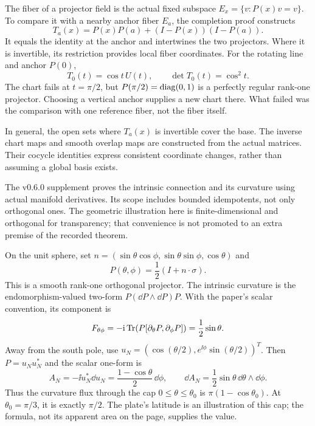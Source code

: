 The fiber of a projector field is the actual fixed subspace $E_x=\{v:P(x)v=v\}$. To compare it with a nearby anchor fiber $E_a$, the completion proof constructs
\[
T_a(x)=P(x)P(a)+(I-P(x))(I-P(a)).
\]
It equals the identity at the anchor and intertwines the two projectors. Where it is invertible, its restriction provides local fiber coordinates.
For the rotating line and anchor $P(0)$,
\[
T_0(t)=\cos t\,U(t),\qquad \det T_0(t)=\cos^2t.
\]
The chart fails at $t=\pi/2$, but $P(\pi/2)=\operatorname{diag}(0,1)$ is a perfectly regular rank-one projector. Choosing a vertical anchor supplies a new chart there. What failed was the comparison with one reference fiber, not the fiber itself.

In general, the open sets where $T_a(x)$ is invertible cover the base. The inverse chart maps and smooth overlap maps are constructed from the actual matrices. Their cocycle identities express consistent coordinate changes, rather than assuming a global basis exists.

The v0.6.0 supplement proves the intrinsic connection and its curvature using actual manifold derivatives. Its scope includes bounded idempotents, not only orthogonal ones. The geometric illustration here is finite-dimensional and orthogonal for transparency; that convenience is not promoted to an extra premise of the recorded theorem.

On the unit sphere, set $n=(\sin\theta\cos\phi,\sin\theta\sin\phi,\cos\theta)$ and
\[
P(\theta,\phi)=\frac12(I+n\cdot\sigma).
\]
This is a smooth rank-one orthogonal projector. The intrinsic curvature is the endomorphism-valued two-form $P(\dd P\wedge\dd P)P$. With the paper's scalar convention, its component is
\[
F_{\theta\phi}=-\ii\Tr\!\left(P[\partial_\theta P,\partial_\phi P]\right)
=\frac12\sin\theta.
\]
Away from the south pole, use $u_N=(\cos(\theta/2),e^{\ii\phi}\sin(\theta/2))^T$. Then $P=u_Nu_N^*$ and the scalar one-form is
\[
A_N=-\ii u_N^*\dd u_N=\frac{1-\cos\theta}{2}\,\dd\phi,
\qquad \dd A_N=\frac12\sin\theta\,\dd\theta\wedge\dd\phi.
\]
Thus the curvature flux through the cap $0\le\theta\le\theta_0$ is $\pi(1-\cos\theta_0)$. At $\theta_0=\pi/3$, it is exactly $\pi/2$. The plate's latitude is an illustration of this cap; the formula, not its apparent area on the page, supplies the value.

